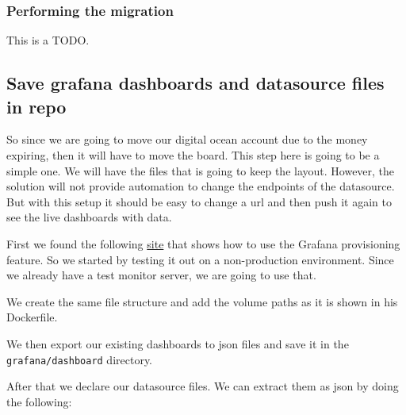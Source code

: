 
\subsubsection{Performing the migration}
\label{log:performing-the-migration}

This is a TODO.

\subsection{Save grafana dashboards and datasource files in repo}
\label{log:save-grafana-dashboards-and-datasource-files-in-repo}

So since we are going to move our digital ocean account due to the money expiring, then it will have to move the board. This step here is going to be a simple one. We will have the files that is going to keep the layout. However, the solution will not provide automation to change the endpoints of the datasource. But with this setup it should be easy to change a url and then push it again to see the live dashboards with data.

First we found the following \href{https://github.com/SebastianTorralba/Self-Provisioned-Grafana}{site} that shows how to use the Grafana provisioning feature. So we started by testing it out on a non-production environment. Since we already have a test monitor server, we are going to use that.

We create the same file structure and add the volume paths as it is shown in his Dockerfile.

We then export our existing dashboards to json files and save it in the \texttt{grafana/dashboard} directory.

After that we declare our datasource files. We can extract them as json by doing the following:


